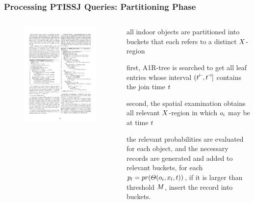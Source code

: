 
\begin{frame}
\frametitle{Processing PTISSJ Queries: Partitioning Phase}

\begin{columns}[c]

  \vspace{-10pt}
  \begin{figure}[tb]
    \includegraphics[width=\columnwidth]{figures/2-4/2-4-7.pdf}
  \end{figure}

  \begin{fitemize}
    \item all indoor objects are partitioned into buckets that each refers to a distinct $\mathnormal{X}$-region
    \item first, A1R-tree is searched to get all leaf entries whose interval $\mathnormal{(t^{\vdash},t^{\dashv}]}$ contains the join time $\mathnormal{t}$
    \item second, the spatial examination obtains all relevant $\mathnormal{X}$-region in which $\mathnormal{o_i}$ may be at time $\mathnormal{t}$
    \item the relevant probabilities are evaluated for each object, and the necessary records are generated and added to relevant buckets, for each $\mathnormal{p_l = pr(\Theta(o_i, x_l, t))}$, if it is larger than threshold $\mathnormal{M}$, insert the record into buckets.
  \end{fitemize}

\end{columns}

\end{frame}

